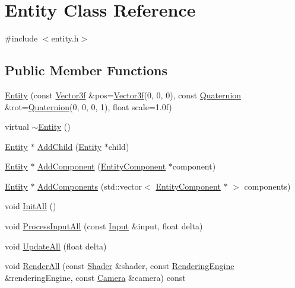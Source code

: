 \hypertarget{class_entity}{}\section{Entity Class Reference}
\label{class_entity}


{\ttfamily \#include $<$entity.\+h$>$}

\subsection*{Public Member Functions}
\begin{DoxyCompactItemize}
\item 
\hyperlink{class_entity_a0ff4aa25e3f7d68cee620ee473d0801c}{Entity} (const \hyperlink{class_vector3f}{Vector3f} \&pos=\hyperlink{class_vector3f}{Vector3f}(0, 0, 0), const \hyperlink{class_quaternion}{Quaternion} \&rot=\hyperlink{class_quaternion}{Quaternion}(0, 0, 0, 1), float scale=1.\+0f)
\item 
virtual \hyperlink{class_entity_adf6d3f7cb1b2ba029b6b048a395cc8ae}{$\sim$\+Entity} ()
\item 
\hyperlink{class_entity}{Entity} $\ast$ \hyperlink{class_entity_a82adda07e5a8db0a7e5d0ff703a1541b}{Add\+Child} (\hyperlink{class_entity}{Entity} $\ast$child)
\item 
\hyperlink{class_entity}{Entity} $\ast$ \hyperlink{class_entity_af95f1fb0432827cf12d397bbe4c6480c}{Add\+Component} (\hyperlink{class_entity_component}{Entity\+Component} $\ast$component)
\item 
\hyperlink{class_entity}{Entity} $\ast$ \hyperlink{class_entity_a884f4b6c8de84250682f7dfaa97a34d4}{Add\+Components} (std\+::vector$<$ \hyperlink{class_entity_component}{Entity\+Component} $\ast$ $>$ components)
\item 
void \hyperlink{class_entity_a555b11eb18ebada6abb9219c316ec7c6}{Init\+All} ()
\item 
void \hyperlink{class_entity_a13845ee7d4ad92ba6bdfbe77f8da8c33}{Process\+Input\+All} (const \hyperlink{class_input}{Input} \&input, float delta)
\item 
void \hyperlink{class_entity_acfca1006fafab6577cee3c3d3af417a6}{Update\+All} (float delta)
\item 
void \hyperlink{class_entity_a6c13950fc02c20544f273b51f93f657b}{Render\+All} (const \hyperlink{class_shader}{Shader} \&shader, const \hyperlink{class_rendering_engine}{Rendering\+Engine} \&rendering\+Engine, const \hyperlink{class_camera}{Camera} \&camera) const 
\item 

\end{DoxyCompactItemize}
